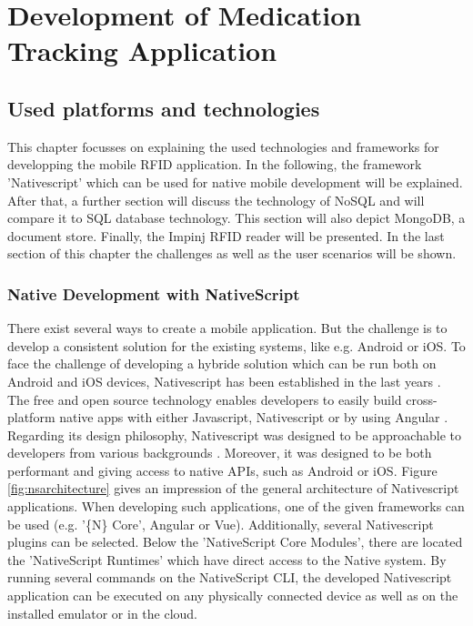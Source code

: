 \chapter{Development of Medication Tracking Application}
\label{Kap3}

\section{Used platforms and technologies} \label{platforms}

This chapter focusses on explaining the used technologies and frameworks for developping the mobile RFID application. In the following, the framework 'Nativescript' which can be used for native mobile development will be explained. After that, a further section will discuss the technology of NoSQL and will compare it to SQL database technology. This section will also depict MongoDB, a document store. Finally, the Impinj RFID reader will be presented. In the last section \pageref{app_development} of this chapter the challenges as well as the user scenarios will be shown. 

\subsection{Native Development with NativeScript} 

There exist several ways to create a mobile application. But the challenge is to develop a consistent solution for the existing systems, like e.g. Android or iOS.
To face the challenge of developing a hybride solution which can be run both on Android and iOS devices, Nativescript has been established in the last years \cite{nativescript}. The free and open source technology enables developers to easily build cross-platform native apps with either Javascript, Nativescript or by using Angular \cite{nativescript}. 
Regarding its design philosophy, Nativescript was designed to be approachable to developers from various backgrounds \cite{nativescript}. Moreover, it was designed to be both performant and giving access to native APIs, such as Android or iOS.
Figure \ref{fig:nsarchitecture} gives an impression of the general architecture of Nativescript applications. When developing such applications, one of the given frameworks can be used (e.g. '\{N\} Core', Angular or Vue). Additionally, several Nativescript plugins can be selected. Below the 'NativeScript Core Modules', there are located the 'NativeScript Runtimes' which have direct access to the Native system. By running several commands on the NativeScript \ac{CLI}, the developed Nativescript application can be executed on any physically connected device as well as on the installed emulator or in the cloud. 

